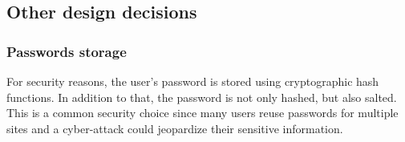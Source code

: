 \subsection{Other design decisions}
\subsubsection{Passwords storage}
For security reasons, the user’s password is stored using cryptographic hash functions. In addition to that, the password is not only hashed, but also salted. This is a common security choice since many users reuse passwords for multiple sites and a cyber-attack could jeopardize their sensitive information.

%